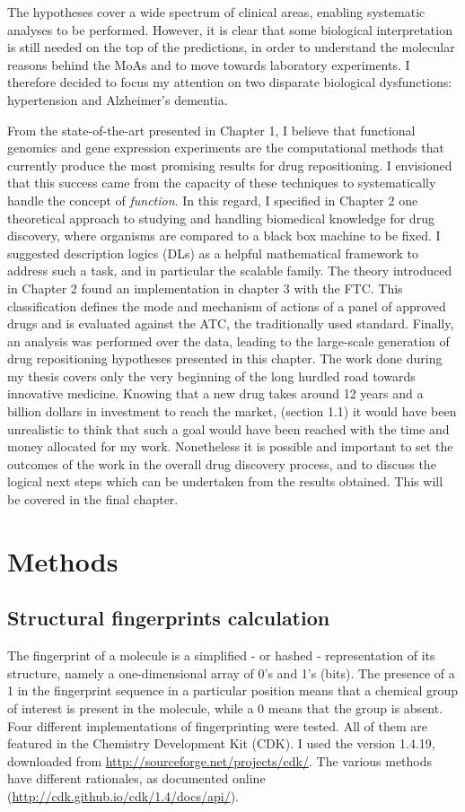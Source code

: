The hypotheses cover a wide spectrum of clinical areas, enabling systematic analyses to be performed. However, it is clear that some biological interpretation is still needed on the top of the predictions, in order to understand the molecular reasons behind the MoAs and to move towards laboratory experiments. I therefore decided to focus my attention on two disparate biological dysfunctions: hypertension and Alzheimer's dementia.

From the state-of-the-art presented in Chapter 1, I believe that functional genomics and gene expression experiments are the computational methods that currently produce the most promising results for drug repositioning. I envisioned that this success came from the capacity of these techniques to systematically handle the concept of \emph{function}. In this regard, I specified in Chapter 2 one theoretical approach to studying and handling biomedical knowledge for drug discovery, where organisms are compared to a black box machine to be fixed. I suggested description logics (DLs) as a helpful mathematical framework to address such a task, and in particular the scalable  family. The theory introduced in Chapter 2 found an implementation in chapter 3 with the FTC. This classification defines the mode and mechanism of actions of a panel of approved drugs and is evaluated against the ATC, the traditionally used standard. Finally, an analysis was performed over the data, leading to the large-scale generation of drug repositioning hypotheses presented in this chapter. The work done during my thesis covers only the very beginning of the long hurdled road towards innovative medicine. Knowing that a new drug takes around 12 years and a billion dollars in investment to reach the market, (section 1.1) it would have been unrealistic to think that such a goal would have been reached with the time and money allocated for my work. Nonetheless it is possible and important to set the outcomes of the work in the overall drug discovery process, and to discuss the logical next steps which can be undertaken from the results obtained. This will be covered in the final chapter.

\section{Methods}

\subsection{Structural fingerprints calculation}
The fingerprint of a molecule is a simplified - or hashed - representation of its structure, namely a one-dimensional array of 0's and 1's (bits). The presence of a 1 in the fingerprint sequence in a particular position means that a chemical group of interest is present in the molecule, while a 0 means that the group is absent. 
Four different implementations of fingerprinting were tested. All of them are featured in the Chemistry Development Kit (CDK). I used the version 1.4.19, downloaded from \url{http://sourceforge.net/projects/cdk/}. The various methods have different rationales, as documented online (\url{http://cdk.github.io/cdk/1.4/docs/api/}).

